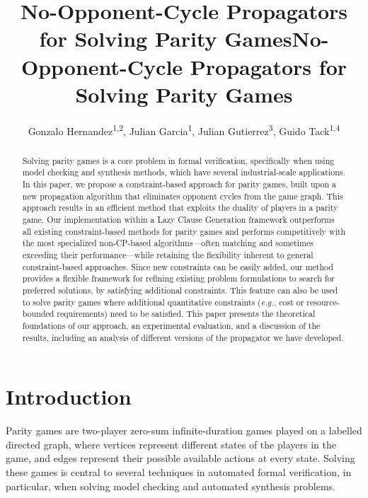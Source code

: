 \documentclass[letterpaper]{article} %
\title{No-Opponent-Cycle Propagators for Solving Parity Games}
\title{No-Opponent-Cycle Propagators for Solving Parity Games}
\author {
    Gonzalo Hernandez\textsuperscript{\rm 1,2},
    Julian Garcia\textsuperscript{\rm 1},
    Julian Gutierrez\textsuperscript{\rm 3},
    Guido Tack\textsuperscript{\rm 1,4}
}
\begin{document}
\maketitle

\begin{abstract}
Solving parity games is a core problem in formal verification, specifically when using model checking and synthesis methods, which have several industrial-scale applications. In this paper, we propose a constraint-based approach for parity games, built upon a new propagation algorithm that eliminates opponent cycles from the game graph. This approach results in an efficient method that exploits the duality of players in a parity game. Our implementation within a Lazy Clause Generation framework outperforms all existing constraint-based methods for parity games and performs competitively with the most specialized non-CP-based algorithms—often matching and sometimes exceeding their performance—while retaining the flexibility inherent to general constraint-based approaches.
%
Since new constraints can be easily added, our method provides a flexible framework for refining existing problem formulations to search for preferred solutions, by satisfying additional constraints. 
%
This feature can also be used to solve parity games where additional quantitative constraints ({\em e.g.}, cost or resource-bounded requirements) need to be satisfied. 
This paper presents the theoretical foundations of our approach, an experimental evaluation, and a discussion of the results, including an analysis of different versions of the propagator we have developed.
\end{abstract}

\section{Introduction}

Parity games are two-player zero-sum infinite-duration games played on a labelled directed graph, where vertices represent different states of the players in the game, and edges represent their possible available actions at every state. 
Solving these games is central to several techniques in automated formal verification, in particular, when solving model checking and automated synthesis problems.
\end{document}
